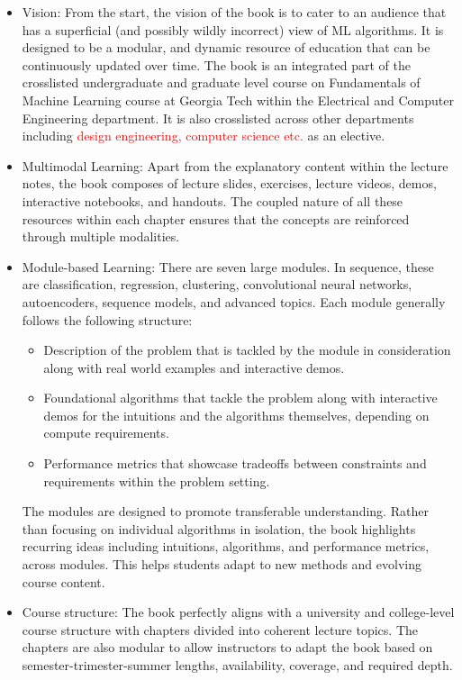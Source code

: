 \documentclass{article}
\begin{document}
\begin{itemize}
    \item Vision: From the start, the vision of the book is to cater to an audience that has a superficial (and possibly wildly incorrect) view of ML algorithms. It is designed to be a modular, and dynamic resource of education that can be continuously updated over time. The book is an integrated part of the crosslisted undergraduate and graduate level course on Fundamentals of Machine Learning course at Georgia Tech within the Electrical and Computer Engineering department. It is also crosslisted across other departments including \textcolor{red}{design engineering, computer science etc.} as an elective.
    \item Multimodal Learning: Apart from the explanatory content within the lecture notes, the book composes of lecture slides, exercises, lecture videos, demos, interactive notebooks, and handouts. The coupled nature of all these resources within each chapter ensures that the concepts are reinforced through multiple modalities.
    \item Module-based Learning: There are seven large modules. In sequence, these are classification, regression, clustering, convolutional neural networks, autoencoders, sequence models, and advanced topics. Each module generally follows the following structure: 
    \begin{itemize}
        \item Description of the problem that is tackled by the module in consideration along with real world examples and interactive demos.
        \item Foundational algorithms that tackle the problem along with interactive demos for the intuitions and the algorithms themselves, depending on compute requirements.
        \item Performance metrics that showcase tradeoffs between constraints and requirements within the problem setting.
    \end{itemize}
    The modules are designed to promote transferable understanding. Rather than focusing on individual algorithms in isolation, the book highlights recurring ideas including intuitions, algorithms, and performance metrics, across modules. This helps students adapt to new methods and evolving course content.
    \item Course structure: The book perfectly aligns with a university and college-level course structure with chapters divided into coherent lecture topics. The chapters are also modular to allow instructors to adapt the book based on semester-trimester-summer lengths, availability, coverage, and required depth.  

\end{itemize}
\end{document}

